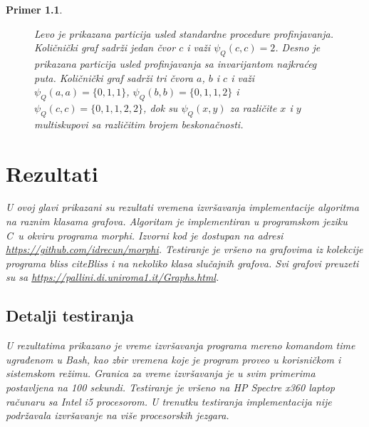 \documentclass[12pt,oneside]{memoir}
\newtheorem{example}{Primer}
\theoremstyle{definition}
\def\CC{{C\nolinebreak[4]\hspace{-.05em}\raisebox{.4ex}{\tiny\bf ++}}}
\begin{document}
\begin{example}
\begin{figure}[htp]
	   \caption{Levo je prikazana particija usled standardne procedure
	   profinjavanja. Količnički graf sadrži jedan čvor $c$ i važi $\psi_Q(c, c)
	   = 2$. Desno je prikazana particija usled profinjavanja sa invarijantom
	   najkraćeg puta. Količnički graf sadrži tri čvora {\color{red}$a$},
	   {\color{green}$b$} i {\color{blue}$c$} i važi $\psi_Q( a, a) = \{0, 1,
	   1\}$, $\psi_Q(b, b) = \{0, 1, 1, 2\}$ i $\psi_Q(c, c) = \{0, 1, 1, 2, 2\}$,
	   dok su $\psi_Q(x, y)$ za različite $x$ i $y$ multiskupovi sa različitim
	   brojem beskonačnosti.}
	   \label{img:graphinv}
   \end{figure}

\chapter{Rezultati}

  U ovoj glavi prikazani su rezultati vremena izvršavanja implementacije
  algoritma na raznim klasama grafova. Algoritam je implementiran u programskom
  jeziku \CC\ u okviru programa \emph{morphi}. Izvorni kod je dostupan na
  adresi \url{https://github.com/idrecun/morphi}.  Testiranje je vršeno na
  grafovima iz kolekcije programa \emph{bliss} citeBliss i na nekoliko klasa
  slučajnih grafova. Svi grafovi preuzeti su sa
  \url{https://pallini.di.uniroma1.it/Graphs.html}.

  \section{Detalji testiranja}

	U rezultatima prikazano je vreme izvršavanja programa mereno komandom
	\emph{time} ugrađenom u \emph{Bash}, kao zbir vremena koje je program
	proveo u korisničkom i sistemskom režimu. Granica za vreme izvršavanja je u
	svim primerima postavljena na 100 sekundi. Testiranje je vršeno na HP
	Spectre x360 laptop računaru sa Intel i5 procesorom. U trenutku testiranja
	implementacija nije podržavala izvršavanje na više procesorskih jezgara.


\end{example}
\end{document}
